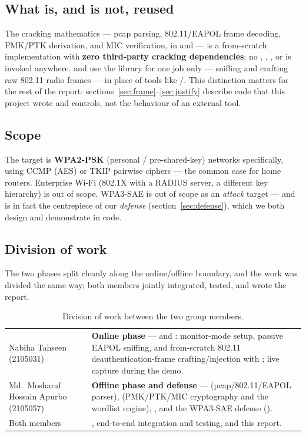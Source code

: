\subsection{What is, and is not, reused}
The cracking mathematics --- pcap parsing, 802.11/EAPOL frame decoding, PMK/PTK derivation, and MIC verification, in  and  --- is a from-scratch implementation with \textbf{zero third-party cracking dependencies}: no , , , or  is invoked anywhere.  and  use the  library for one job only --- sniffing and crafting raw 802.11 radio frames --- in place of tools like /. This distinction matters for the rest of the report: sections~\ref{sec:frame}--\ref{sec:justify} describe code that this project wrote and controls, not the behaviour of an external tool.

\subsection{Scope}
The target is \textbf{WPA2-PSK} (personal / pre-shared-key) networks specifically, using CCMP (AES) or TKIP pairwise ciphers --- the common case for home routers. Enterprise Wi-Fi (802.1X with a RADIUS server, a different key hierarchy) is out of scope. WPA3-SAE is out of scope as an \emph{attack} target --- and is in fact the centrepiece of our \emph{defense} (section~\ref{sec:defense}), which we both design and demonstrate in code.

\subsection{Division of work}
The two phases split cleanly along the online/offline boundary, and the work was divided the same way; both members jointly integrated, tested, and wrote the report.

\begin{table}[H]\centering\small
\setlength{\tabcolsep}{9pt}
\begin{tabularx}{\textwidth}{@{}L{4.9cm} L{9.2cm}@{}}
\toprule
{} &  \\
\midrule
Nabiha Tahseen \newline (2105031) & \textbf{Online phase} ---  and : monitor-mode setup, passive EAPOL sniffing, and from-scratch 802.11 deauthentication-frame crafting/injection with ; live capture during the demo. \\
Md.\ Mosharaf Hossain Apurbo \newline (2105057) & \textbf{Offline phase and defense} ---  (pcap/802.11/EAPOL parser),  (PMK/PTK/MIC cryptography and the wordlist engine), , and the WPA3-SAE defense (). \\
\midrule
Both members & , end-to-end integration and testing, and this report. \\
\bottomrule
\end{tabularx}
\caption{Division of work between the two group members.}
\end{table}

